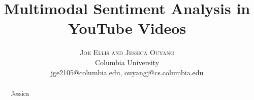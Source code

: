 \documentclass[twoside]{article}
\title{\vspace{-15mm}\fontsize{24pt}{10pt}\selectfont\textbf{Multimodal Sentiment Analysis in YouTube Videos}} %
\author{
\large
\textsc{Joe Ellis and Jessica Ouyang} \\ %
\normalsize Columbia University \\ %
\normalsize \href{mailto:jge2105@columbia.edu}{jge2105@columbia.edu}, %
\normalsize \href{mailto:ouyangj@cs.columbia.edu}{ouyangj@cs.columbia.edu} %
\vspace{-5mm}
}
\date{}
\begin{document}
\maketitle %

\thispagestyle{fancy} %


\begin{abstract}
Jessica
\end{abstract}

\end{document}
